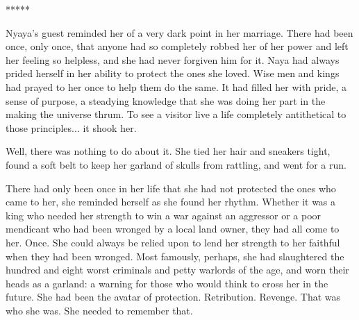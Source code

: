 \documentclass{amsart}
\begin{document}
\begin{comment}
The only comfort in this entire prison was in the company of the other prisoners. Most of his neighbors had been imprisoned for going on two millennia with nothing but each other. None of them had access to their followers or their prayers. No one could punish or perform miracles, grant boons or rain devastation on any earthly being. In short, no one could not do any of the things that made them happy. When They had found out that each of them had made themselves known to Their human creations, They had hunted each of them down and placed them in this purgatory. None of them had any access to anything from their old lives. And none of them had ever heard from Them again. Instead, they all found themselves in a strange land, with nothing to do all day, visited by souls that were twisted bastardizations of the very work that they had tried to do in earth. A teacher ripping into your best work on a daily basis, not because of any fault of the work, but because They were upset.

It was one thing to endure this punishment for an untold number of centuries to come in the company of ones peers. To endure it in solitude was something else altogether. 
\end{comment}
\begin{center} ***** \end{center}

Nyaya's guest reminded her of a very dark point in her marriage. There had been once, only once, that anyone had so completely robbed her of her power and left her feeling so helpless, and she had never forgiven him for it. Naya had always prided herself in her ability to protect the ones she loved. Wise men and kings had prayed to her once to help them do the same. It had filled her with pride, a sense of purpose, a steadying knowledge that she was doing her part in the making the universe thrum. To see a visitor live a life completely antithetical to those principles... it shook her.

Well, there was nothing to do about it. She tied her hair and sneakers tight, found a soft belt to keep her garland of skulls from rattling, and went for a run.

There had only been once in her life that she had not protected the ones who came to her, she reminded herself as she found her rhythm. Whether it was a king who needed her strength to win a war against an aggressor or a poor mendicant who had been wronged by a local land owner, they had all come to her. Once. She could always be relied upon to lend her strength to her faithful when they had been wronged. Most famously, perhaps, she had slaughtered the hundred and eight worst criminals and petty warlords of the age, and worn their heads as a garland: a warning for those who would think to cross her in the future. She had been the avatar of protection. Retribution. Revenge. That was who she was. She needed to remember that.
\end{document}
